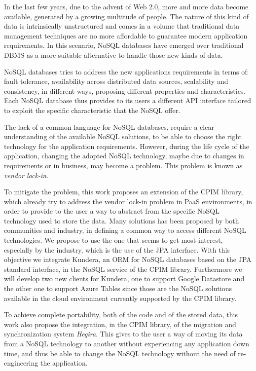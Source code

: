 In the last few years, due to the advent of Web 2.0, more and more data become available, generated by a growing multitude of people. The nature of this kind of data is intrinsically unstructured and comes in a volume that traditional data management techniques are no more affordable to guarantee modern application requirements.
In this scenario, NoSQL databases have emerged over traditional DBMS as a more suitable alternative to handle those new kinds of data.

\noindent NoSQL databases tries to address the new applications requirements in terms of: fault tolerance, availability across distributed data sources, scalability and consistency, in different ways, proposing different properties and characteristics. 
Each NoSQL database thus provides to its users a different API interface tailored to exploit the specific characteristic that the NoSQL offer.

\noindent The lack of a common language for NoSQL databases, require a clear understanding of the available NoSQL solutions, to be able to choose the right technology for the application requirements. However, during the life cycle of the application, changing the adopted NoSQL technology, maybe due to changes in requirements or in business, may become a problem. This problem is known as \textit{vendor lock-in}.    

\noindent To mitigate the problem, this work proposes an extension of the CPIM library, which already try to address the vendor lock-in problem in PaaS environments, in order to provide to the user a way to abstract from the specific NoSQL technology used to store the data.
Many solutions has been proposed by both communities and industry, in defining a common way to access different NoSQL technologies. We propose to use the one that seems to get most interest, especially by the industry, which is the use of the JPA interface. With this objective we integrate Kundera, an ORM for NoSQL databases based on the JPA standard interface, in the NoSQL service of the CPIM library. 
\noindent Furthermore we will develop two new clients for Kundera, one to support Google Datastore and the other one to support Azure Tables since those are the NoSQL solutions available in the cloud environment currently supported by the CPIM library.

\noindent To achieve complete portability, both of the code and of the stored data, this work also propose the integration, in the CPIM library, of the migration and synchronization system \textit{Hegira}. This gives to the user a way of moving its data from a NoSQL technology to another without experiencing any application down time, and thus be able to change the NoSQL technology without the need of re-engineering the application.
 
